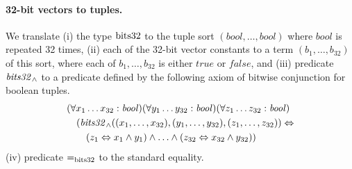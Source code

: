 \paragraph{32-bit vectors to tuples.}
We translate
(i) the type $\mathrm{bits32}$ to the tuple sort $(\mathit{bool},\ldots,\mathit{bool})$ where $\mathit{bool}$ is repeated 32 times,
(ii) each of the 32-bit vector constants to a term $(b_1,\ldots,b_{32})$ of this sort, where each of $b_1,\ldots,b_{32}$ is either $\mathit{true}$ or $\mathit{false}$, and
(iii) predicate $\mathit{bits32}_\wedge$ to a predicate defined by the following axiom of bitwise conjunction for boolean tuples.
\begin{equation*}
\begin{aligned}
&(\forall x_1\ldots x_{32}:\mathit{bool})(\forall y_1\ldots y_{32}:\mathit{bool})(\forall z_1\ldots z_{32}:\mathit{bool})\\
&\quad(\mathit{bits32}_\wedge((x_1,\ldots,x_{32}),(y_1,\ldots,y_{32}),(z_1,\ldots,z_{32}))\Leftrightarrow\\
&\quad\quad (z_1\Leftrightarrow x_1\wedge y_1)\wedge\ldots\wedge(z_{32}\Leftrightarrow x_{32}\wedge y_{32}))
\end{aligned}
\end{equation*}
(iv) predicate $\mathit{=}_{\mathrm{bits32}}$ to the standard equality.

